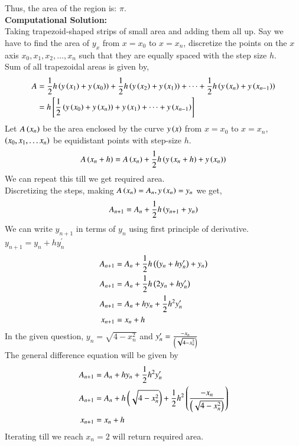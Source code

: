 \documentclass[journal]{IEEEtran}
\begin{document}
Thus, the area of the region is:
$\pi$.\\
\textbf{Computational Solution:}\\
Taking trapezoid-shaped strips of small area and adding them all up. Say we have to find the area of $y_{x}$ from $x=x_0$ to $x=x_n$, discretize the points on the $x$ axis $x_0, x_1, x_2, \dots, x_n$ such that they are equally spaced with the step size $h$. \\
Sum of all trapezoidal areas is given by,
\begin{align}
  A&=\frac{1}{2}h\left(y\left(x_1\right)+y\left(x_0\right)\right)+ \frac{1}{2}h\left(y\left(x_2\right)+y\left(x_1\right)\right)+\dots+\frac{1}{2}h\left(y\left(x_n\right)+y\left(x_{n-1}\right)\right)\\
  &=h{}\left[\frac{1}{2}\left(y\left(x_0\right)+y\left(x_n\right)\right)+ y\left(x_1\right)+\dots+y\left(x_{n-1}\right)\right]
\end{align}
Let $A\left(x_n\right)$ be the area enclosed by the curve $y\left(x\right)$ from $x=x_0$ to $x=x_n$, $\left(x_0, x_1, \dots x_n\right)$ be equidistant points with step-size $h$.
\begin{align}
  A\left(x_n+h\right)=A\left(x_n\right)+\frac{1}{2}h\left(y\left(x_n+h\right)+y\left(x_n\right)\right)
\end{align}
We can repeat this till we get required area.\\
Discretizing the steps, making $A\left(x_n\right)=A_n, y\left(x_n\right)=y_n$ we get,
\begin{align}
 A_{n+1}=A_n+\frac{1}{2}h\left(y_{n+1}+y_n\right)
\end{align}
We can write $y_{n+1}$ in terms of $y_n$ using first principle of derivative. $y_{n+1}=y_n+hy^{\prime}_n$
\begin{align}
  A_{n+1}&=A_n+\frac{1}{2}h\left(\left(y_{n}+hy^{\prime}_n\right)+y_n\right)\\
  A_{n+1}&=A_n+\frac{1}{2}h\left(2y_n+hy^{\prime}_n\right)\\
  A_{n+1}&=A_n+hy_n+\frac{1}{2}h^2y^{\prime}_n\\
  x_{n+1}&=x_n+h
\end{align}
In the given question, $y_n=\sqrt{4-x_n^2}$ and $y^{\prime}_n= \frac{-x_n}{\left(\sqrt{4-x_n^2}\right)}$\\
The general difference equation will be given by
\begin{align}
  A_{n+1}&=A_n+hy_n+\frac{1}{2}h^2y^{\prime}_n\\
  A_{n+1}&=A_n+h\left(\sqrt{4-x_n^2}\right)+\frac{1}{2}h^2\left(\frac{-x_n}{\left(\sqrt{4-x_n^2}\right)}\right)\\
  x_{n+1}&=x_n+h
\end{align}
Iterating till we reach $x_n=2$ will return required area. \\
\end{document}
